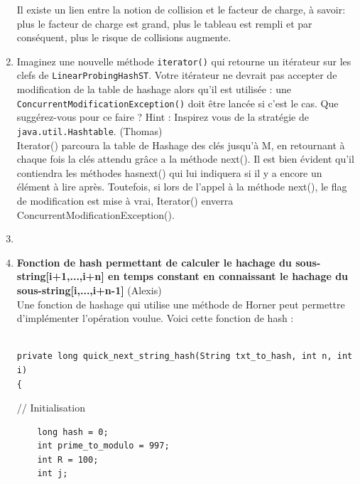 \documentclass[11pt]{article}
\begin{document}
\begin{enumerate}
Il existe un lien entre la notion de collision et le facteur de charge, à  savoir: plus le facteur de charge est grand, plus le tableau est rempli et par conséquent, plus le risque de collisions augmente.


\item Imaginez une nouvelle méthode \texttt{iterator()} qui retourne un itérateur sur les clefs de \texttt{LinearProbingHashST}. Votre itérateur ne devrait pas accepter de modification de la table de hashage alors qu'il est utilisée :
une \texttt{ConcurrentModificationException()} doit être lancée si c'est le cas. Que suggérez-vous pour ce faire ? Hint : Inspirez vous de la stratégie de \texttt{java.util.Hashtable}. (Thomas)\\

Iterator() parcoura la table de Hashage des clés jusqu'à M, en retournant à chaque fois la clés attendu grâce a la méthode next(). Il est bien évident qu'il contiendra les méthodes hasnext() qui lui indiquera si il y a encore un élément à lire après. Toutefois, si lors de l'appel à la méthode next(), le flag de modification est mise à vrai, Iterator() enverra ConcurrentModificationException().

\item 
\item \textbf{Fonction de hash permettant de calculer le hachage du sous-string[i+1,...,i+n] en temps constant en connaissant le hachage du sous-string[i,...,i+n-1]} (Alexis)\\

Une fonction de hashage qui utilise une méthode de Horner peut permettre d'implémenter
l'opération voulue.
Voici cette fonction de hash :

\begin{lstlisting}

private long quick_next_string_hash(String txt_to_hash, int n, int i)
{
\end{lstlisting}
	// Initialisation
\begin{lstlisting}
	long hash = 0;
	int prime_to_modulo = 997;
	int R = 100;
	int j;
	

\end{lstlisting}
\end{enumerate}
\end{document}
